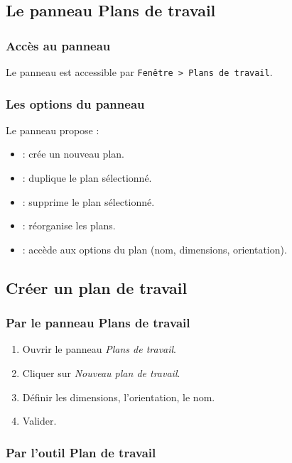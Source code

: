 \subsection{Le panneau Plans de travail}

\subsubsection{Accès au panneau}

Le panneau  est accessible par \texttt{Fenêtre > Plans de travail}.

\subsubsection{Les options du panneau}

Le panneau propose :

\begin{itemize}
    \item {} : crée un nouveau plan.
    \item {} : duplique le plan sélectionné.
    \item {} : supprime le plan sélectionné.
    \item {} : réorganise les plans.
    \item {} : accède aux options du plan (nom, dimensions, orientation).
\end{itemize}

\subsection{Créer un plan de travail}

\subsubsection{Par le panneau Plans de travail}

\begin{enumerate}
    \item Ouvrir le panneau \emph{Plans de travail}.
    \item Cliquer sur \emph{Nouveau plan de travail}.
    \item Définir les dimensions, l'orientation, le nom.
    \item Valider.
\end{enumerate}

\subsubsection{Par l'outil Plan de travail}

